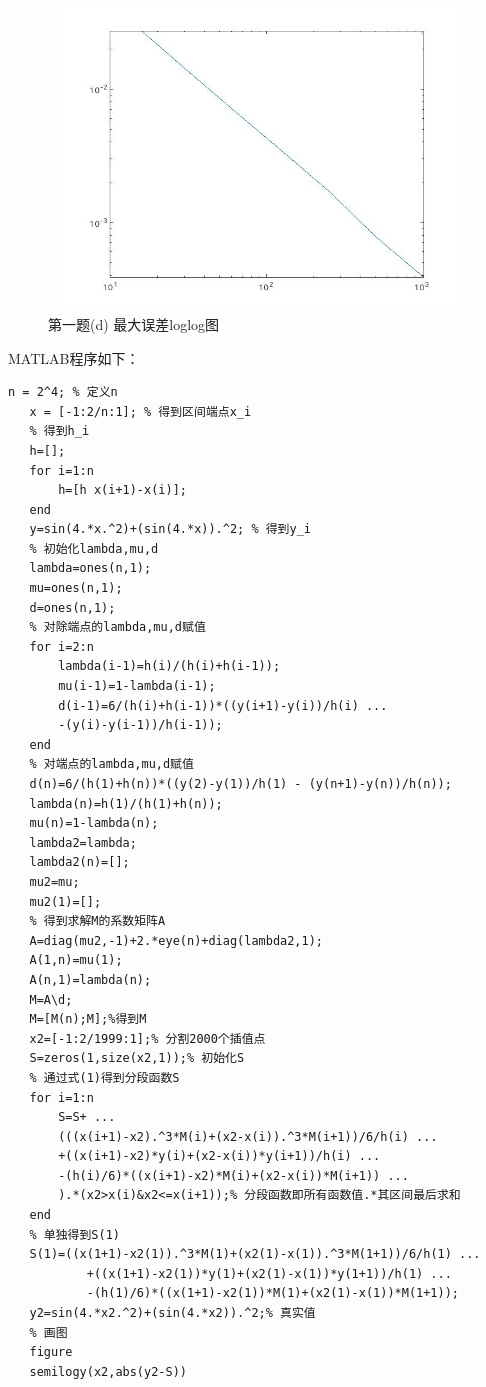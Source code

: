 \documentclass[12pt,a4paper,utf8]{ctexart}
\begin{document}
\begin{enumerate}
\begin{figure}[htbp]
   \centering
   \includegraphics[width=15cm,height=8cm]{ex1d2.jpg}
   \caption{第一题(d) 最大误差loglog图}
\end{figure}

MATLAB程序如下：
\begin{lstlisting}[frame=single]
   n = 2^4; % 定义n
   x = [-1:2/n:1]; % 得到区间端点x_i
   % 得到h_i
   h=[];
   for i=1:n
       h=[h x(i+1)-x(i)];
   end 
   y=sin(4.*x.^2)+(sin(4.*x)).^2; % 得到y_i
   % 初始化lambda,mu,d
   lambda=ones(n,1);
   mu=ones(n,1);
   d=ones(n,1);
   % 对除端点的lambda,mu,d赋值
   for i=2:n
       lambda(i-1)=h(i)/(h(i)+h(i-1));
       mu(i-1)=1-lambda(i-1);
       d(i-1)=6/(h(i)+h(i-1))*((y(i+1)-y(i))/h(i) ... 
       -(y(i)-y(i-1))/h(i-1));
   end
   % 对端点的lambda,mu,d赋值
   d(n)=6/(h(1)+h(n))*((y(2)-y(1))/h(1) - (y(n+1)-y(n))/h(n));
   lambda(n)=h(1)/(h(1)+h(n));
   mu(n)=1-lambda(n);
   lambda2=lambda;
   lambda2(n)=[];
   mu2=mu;
   mu2(1)=[];
   % 得到求解M的系数矩阵A
   A=diag(mu2,-1)+2.*eye(n)+diag(lambda2,1);
   A(1,n)=mu(1);
   A(n,1)=lambda(n);
   M=A\d; 
   M=[M(n);M];%得到M
   x2=[-1:2/1999:1];% 分割2000个插值点
   S=zeros(1,size(x2,1));% 初始化S
   % 通过式(1)得到分段函数S
   for i=1:n
       S=S+ ...
       (((x(i+1)-x2).^3*M(i)+(x2-x(i)).^3*M(i+1))/6/h(i) ...
       +((x(i+1)-x2)*y(i)+(x2-x(i))*y(i+1))/h(i) ...
       -(h(i)/6)*((x(i+1)-x2)*M(i)+(x2-x(i))*M(i+1)) ...
       ).*(x2>x(i)&x2<=x(i+1));% 分段函数即所有函数值.*其区间最后求和
   end
   % 单独得到S(1)
   S(1)=((x(1+1)-x2(1)).^3*M(1)+(x2(1)-x(1)).^3*M(1+1))/6/h(1) ...
           +((x(1+1)-x2(1))*y(1)+(x2(1)-x(1))*y(1+1))/h(1) ...
           -(h(1)/6)*((x(1+1)-x2(1))*M(1)+(x2(1)-x(1))*M(1+1));
   y2=sin(4.*x2.^2)+(sin(4.*x2)).^2;% 真实值
   % 画图
   figure
   semilogy(x2,abs(y2-S))
   

\end{lstlisting}
\end{enumerate}
\end{document}
